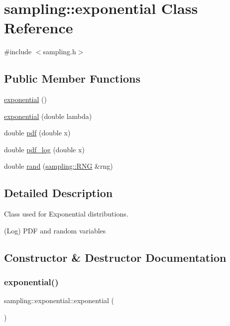 \hypertarget{classsampling_1_1exponential}{}\section{sampling\+:\+:exponential Class Reference}
\label{classsampling_1_1exponential}


{\ttfamily \#include $<$sampling.\+h$>$}

\subsection*{Public Member Functions}
\begin{DoxyCompactItemize}
\item 
\hyperlink{classsampling_1_1exponential_a796a16d5cabd2f203e11be1aabc7334f}{exponential} ()
\item 
\hyperlink{classsampling_1_1exponential_a1fd04756818bbbd7e52f48aab791a66d}{exponential} (double lambda)
\item 
double \hyperlink{classsampling_1_1exponential_aa839d6994b83c79b91993b35bb8173e9}{pdf} (double x)
\item 
double \hyperlink{classsampling_1_1exponential_af1a70f21711c1a0da8643c0103b51f37}{pdf\+\_\+log} (double x)
\item 
double \hyperlink{classsampling_1_1exponential_ae225fd6ab66ed65ae1ef4cf090060149}{rand} (\hyperlink{classsampling_1_1RNG}{sampling\+::\+R\+NG} \&rng)
\end{DoxyCompactItemize}


\subsection{Detailed Description}
Class used for Exponential distributions.

(Log) P\+DF and random variables 

\subsection{Constructor \& Destructor Documentation}
\mbox{\label{classsampling_1_1exponential_a796a16d5cabd2f203e11be1aabc7334f}} 
\subsubsection{\texorpdfstring{exponential()}{exponential()}\hspace{0.1cm}{\footnotesize\ttfamily [1/2]}}
{\footnotesize\ttfamily sampling\+::exponential\+::exponential (\begin{DoxyParamCaption}{ }\end{DoxyParamCaption})}

